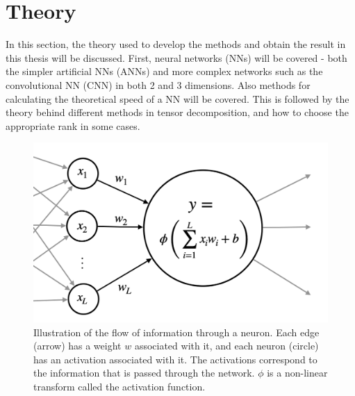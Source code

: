\section{Theory} \label{tex:theory}
In this section, the theory used to develop the methods and obtain the result in this thesis will be discussed. First, neural networks (NNs) will be covered - both the simpler artificial NNs (ANNs) and more complex networks such as the convolutional NN (CNN) in both 2 and 3 dimensions. Also methods for calculating the theoretical speed of a NN will be covered. This is followed by the theory behind different methods in tensor decomposition, and how to choose the appropriate rank in some cases.
\begin{figure}[H]
    \centering
    \captionsetup{width=.95\linewidth}
    \includegraphics[width=.7\linewidth]{Pics/02_Theory/activation_illustration.png}
    \caption{Illustration of the flow of information through a neuron. Each edge (arrow) has a weight $w$ associated with it, and each neuron (circle) has an activation associated with it. The activations correspond to the information that is passed through the network. $\phi$ is a non-linear transform called the activation function.}
    \label{fig:activation_illustration}
\end{figure}



